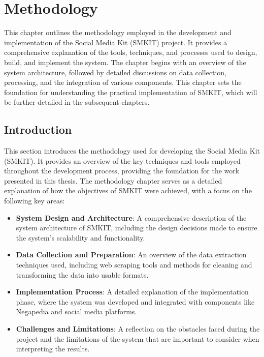 
\chapter{Methodology}
\label{chp:methodology}
This chapter outlines the methodology employed in the development and implementation of the Social Media Kit (SMKIT) project. It provides a comprehensive explanation of the tools, techniques, and processes used to design, build, and implement the system. The chapter begins with an overview of the system architecture, followed by detailed discussions on data collection, processing, and the integration of various components.
This chapter sets the foundation for understanding the practical implementation of SMKIT, which will be further detailed in the subsequent chapters.


\section{Introduction}
\label{sec:introduction}
This section introduces the methodology used for developing the Social Media Kit (SMKIT). It provides an overview of the key techniques and tools employed throughout the development process, providing the foundation for the work presented in this thesis. The methodology chapter serves as a detailed explanation of how the objectives of SMKIT were achieved, with a focus on the following key areas:

\begin{itemize}
    \item \textbf{System Design and Architecture}: A comprehensive description of the system architecture of SMKIT, including the design decisions made to ensure the system’s scalability and functionality.
    \item \textbf{Data Collection and Preparation}: An overview of the data extraction techniques used, including web scraping tools and methods for cleaning and transforming the data into usable formats.
    \item \textbf{Implementation Process}: A detailed explanation of the implementation phase, where the system was developed and integrated with components like Negapedia and social media platforms.
    \item \textbf{Challenges and Limitations}: A reflection on the obstacles faced during the project and the limitations of the system that are important to consider when interpreting the results.
\end{itemize}


